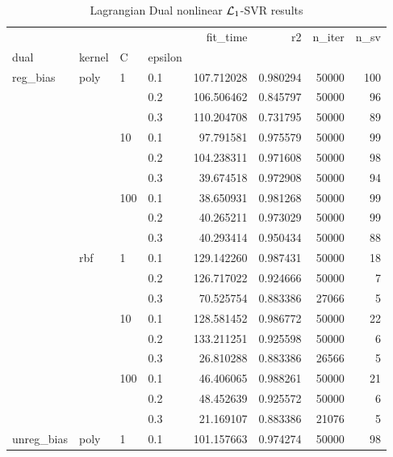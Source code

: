 \begin{table}[H]
\centering
\caption{Lagrangian Dual nonlinear $\protect \mathcal{L}_1$-SVR results}
\label{nonlinear_lagrangian_dual_l1_svr_cv_results}
\begin{tabular}{llllrrrr}
\toprule
           &     &     &     &    fit\_time &        r2 &  n\_iter &  n\_sv \\
dual & kernel & C & epsilon &             &           &         &       \\
\midrule
reg\_bias & poly & 1   & 0.1 &  107.712028 &  0.980294 &   50000 &   100 \\
           &     &     & 0.2 &  106.506462 &  0.845797 &   50000 &    96 \\
           &     &     & 0.3 &  110.204708 &  0.731795 &   50000 &    89 \\
           &     & 10  & 0.1 &   97.791581 &  0.975579 &   50000 &    99 \\
           &     &     & 0.2 &  104.238311 &  0.971608 &   50000 &    98 \\
           &     &     & 0.3 &   39.674518 &  0.972908 &   50000 &    94 \\
           &     & 100 & 0.1 &   38.650931 &  0.981268 &   50000 &    99 \\
           &     &     & 0.2 &   40.265211 &  0.973029 &   50000 &    99 \\
           &     &     & 0.3 &   40.293414 &  0.950434 &   50000 &    88 \\
           & rbf & 1   & 0.1 &  129.142260 &  0.987431 &   50000 &    18 \\
           &     &     & 0.2 &  126.717022 &  0.924666 &   50000 &     7 \\
           &     &     & 0.3 &   70.525754 &  0.883386 &   27066 &     5 \\
           &     & 10  & 0.1 &  128.581452 &  0.986772 &   50000 &    22 \\
           &     &     & 0.2 &  133.211251 &  0.925598 &   50000 &     6 \\
           &     &     & 0.3 &   26.810288 &  0.883386 &   26566 &     5 \\
           &     & 100 & 0.1 &   46.406065 &  0.988261 &   50000 &    21 \\
           &     &     & 0.2 &   48.452639 &  0.925572 &   50000 &     6 \\
           &     &     & 0.3 &   21.169107 &  0.883386 &   21076 &     5 \\
unreg\_bias & poly & 1   & 0.1 &  101.157663 &  0.974274 &   50000 &    98 \\

\end{tabular}
\end{table}
